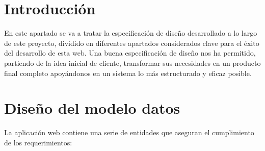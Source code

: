 
\section{Introducción}
En este apartado se va a tratar la especificación de diseño desarrollado a lo largo de este proyecto, dividido en diferentes apartados considerados clave para el éxito del desarrollo de esta web. Una buena especificación de diseño nos ha permitido, partiendo de la idea inicial de cliente, transformar sus necesidades en un producto final completo apoyándonos en un sistema lo más estructurado y eficaz posible.

\section{Diseño del modelo datos}
La aplicación web contiene una serie de entidades que aseguran el cumplimiento de los requerimientos:
